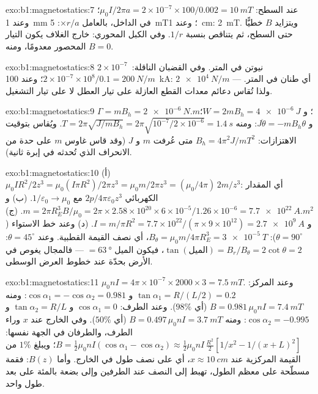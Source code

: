 \begin{solution}{exo:b1:magnetostatics:7}
عند السطح: $\mu_0I/2\pi a = 2 \times 10^{-7} \times 100/0.002 = \qty{10}{mT}$؛ وعند
\qty{1}{mm} في الداخل، بالعامل $\times r/a$: \qty{5}{mT}؛ وعند \qty{1}{cm}: \qty{2}{mT}. ويتزايد $B$
خطيًّا حتى السطح، ثم يتناقص بنسبة $1/r$. وفي الكبل المحوري: خارج الغلاف
يكون التيار المحصور معدومًا، ومنه $B = 0$.
\end{solution}

\begin{solution}{exo:b1:magnetostatics:8}
$2 \times 10^{-7}$~نيوتن في المتر. وفي القضبان الناقلة: $2 \times 10^{-7} \times 10^8/0.1 = \qty{200}{N/m}$؛
وعند \qty{100}{kA}: $\qty{2e4}{N/m}$ --- أي طنان في المتر. ولذا تُقاس دعائم
معدات القطع العازلة على تيار العطل لا على تيار
التشغيل.
\end{solution}

\begin{solution}{exo:b1:magnetostatics:9}
$\Gamma = mB_h = \qty{2e-6}{N.m}$؛ و $W = 2mB_h = \qty{4e-6}{J}$؛ و $J\ddot\theta =
-mB_h\theta$: ومنه $T = 2\pi\sqrt{J/mB_h} = 2\pi\sqrt{10^{-7}/2 \times 10^{-6}} =
\qty{1.4}{s}$. ويُقاس بتوقيت الاهتزازات: $B_h = 4\pi^2J/mT^2$ متى عُرفت $m$ و $J$
(وقد قاس غاوس $m$ على حدة من الانحراف الذي تُحدثه في
إبرة ثانية).
\end{solution}

\begin{solution}{exo:b1:magnetostatics:10}
(أ) $\mu_0IR^2/2z^3 = \mu_0(I\pi R^2)/2\pi z^3 = \mu_0m/2\pi z^3 = (\mu_0/4\pi)\,2m/z^3$:
أي المقدار الكهربائي $2p/4\pi\varepsilon_0z^3$ مع $1/\varepsilon_0 \to \mu_0$. (ب) و $m = 2\pi R_E^3B/
\mu_0 = 2\pi \times 2.58 \times 10^{20} \times 6 \times 10^{-5}/1.26 \times 10^{-6} = \qty{7.7e22}{A.m^2}$.
(ج) و $I = m/\pi R^2 = 7.7 \times 10^{22}/(\pi \times 9 \times 10^{12}) = \qty{2.7e9}{A}$. (د)
وعند خط الاستواء ($\theta = 90^\circ$): $B_\theta = \mu_0m/4\pi R_E^3 = \qty{3e-5}{T}$، أي نصف
القيمة القطبية. وعند $\theta = 45^\circ$: $\tan(\text{الميل}) = B_r/B_\theta = 2\cot\theta = 2$،
فيكون الميل $= \qty{63}{\degree}$ --- فالمجال يغوص في الأرض بحدّة عند
خطوط العرض الوسطى.
\end{solution}

\begin{solution}{exo:b1:magnetostatics:11}
$\mu_0nI = 4\pi \times 10^{-7} \times 2000 \times 3 = \qty{7.5}{mT}$. وعند المركز: $\tan\alpha_1 =
R/(L/2) = 0.2$ و $\cos\alpha_1 = -\cos\alpha_2 = 0.981$: ومنه $B = 0.981\,\mu_0nI =
\qty{7.4}{mT}$ (أي $98\%$). وعند الطرف: $\cos\alpha_1 = 0$ و $\tan\alpha_2 = R/L$ و $\cos\alpha_2 =
-0.995$: ومنه $B = 0.497\,\mu_0nI = \qty{3.7}{mT}$ (أي $50\%$). وفي الخارج عند $x$ وراء
الطرف، والطرفان في الجهة نفسها: $B = \tfrac12\mu_0nI(\cos\alpha_1 - \cos\alpha_2)
\approx \tfrac12\mu_0nI\,\tfrac{R^2}{2}[1/x^2 - 1/(x + L)^2]$؛ ويبلغ $1\%$ من القيمة
المركزية عند $x \approx \qty{10}{cm}$، أي على نصف طول في الخارج. وأما $B(z)$: فقمة مسطّحة على
معظم الطول، تهبط إلى النصف عند الطرفين وإلى بضعة بالمئة على بعد
طول واحد.
\end{solution}

